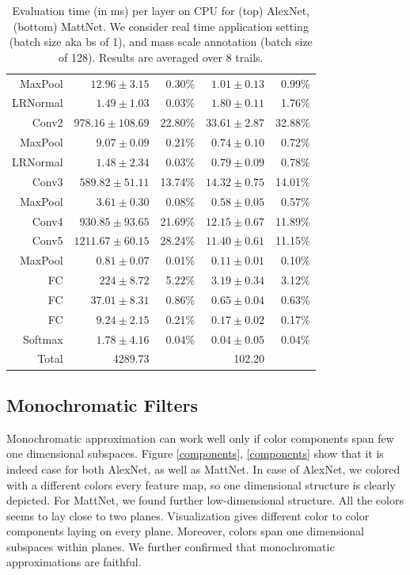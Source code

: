 \begin{table}[t]
{\begin{tabular}{rrrrr}
MaxPool & $12.96 \pm 3.15$ & 0.30\% & $1.01 \pm 0.13$ & 0.99\% \\
LRNormal & $1.49 \pm 1.03$ & 0.03\% & $1.80 \pm 0.11$ & 1.76\% \\
Conv2 & $978.16 \pm 108.69$ & 22.80\% & $33.61 \pm 2.87$ & 32.88\% \\
MaxPool & $9.07 \pm 0.09$ & 0.21\% & $0.74 \pm 0.10$ & 0.72\% \\
LRNormal & $1.48 \pm 2.34$ & 0.03\% & $0.79 \pm 0.09$ & 0.78\% \\
Conv3 & $589.82 \pm 51.11$ & 13.74\% & $14.32 \pm 0.75$ & 14.01\% \\
MaxPool & $3.61 \pm 0.30$ & 0.08\% & $0.58 \pm 0.05$ & 0.57\% \\
Conv4 & $930.85 \pm 93.65$ & 21.69\% & $12.15 \pm 0.67$ & 11.89\% \\
Conv5 & $1211.67 \pm 60.15$ & 28.24\% & $11.40 \pm 0.61$ & 11.15\% \\
MaxPool & $0.81 \pm 0.07$ & 0.01\% & $0.11 \pm 0.01$ & 0.10\% \\
FC & $224 \pm 8.72$ & 5.22\% & $3.19 \pm 0.34$ & 3.12\% \\
FC & $37.01 \pm 8.31$ & 0.86\% & $0.65 \pm 0.04$ & 0.63\% \\
FC & $9.24 \pm 2.15$ & 0.21\% & $0.17 \pm 0.02$ & 0.17\% \\
Softmax & $1.78 \pm 4.16$ & 0.04\% & $0.04 \pm 0.05$ & 0.04\%\\
\hline 
Total & 4289.73 & & 102.20 & \\
\hline
\end{tabular}
}
\caption{Evaluation time (in ms) per layer on CPU for (top) AlexNet, (bottom) MattNet. We consider real time application setting (batch size aka bs of 1), and
mass scale annotation (batch size of 128). Results are averaged over 8 trails.} 
\label{evaluation_time}
\end{table}



\subsection{Monochromatic Filters}
Monochromatic approximation can work well only if color components span few one dimensional subspaces. 
Figure \ref{components}, \ref{components} show that it is indeed case for both AlexNet, as
well as MattNet. In case of AlexNet, we colored with a different colors every feature map, so one dimensional structure
is clearly depicted. For MattNet, we found further low-dimensional structure. All the colors seems to lay close
to two planes. Visualization gives different color to color components laying on every plane. Moreover,
colors span one dimensional subspaces within planes. We further confirmed that monochromatic approximations
are faithful. 

